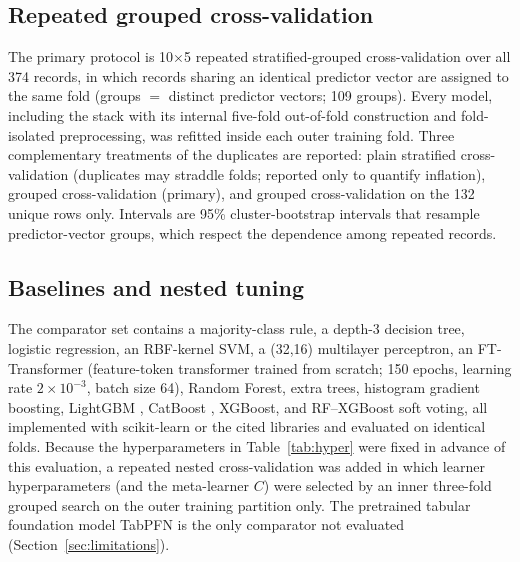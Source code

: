 \documentclass[a4paper,fleqn]{cas-dc}
\begin{document}
\subsection{Repeated grouped cross-validation}
\label{sec:cvprot}
The primary protocol is 10$\times$5 repeated stratified-grouped cross-validation over all 374 records, in which records sharing an identical predictor vector are assigned to the same fold (groups $=$ distinct predictor vectors; 109 groups). Every model, including the stack with its internal five-fold out-of-fold construction and fold-isolated preprocessing, was refitted inside each outer training fold. Three complementary treatments of the duplicates are reported: plain stratified cross-validation (duplicates may straddle folds; reported only to quantify inflation), grouped cross-validation (primary), and grouped cross-validation on the 132 unique rows only. Intervals are 95\% cluster-bootstrap intervals that resample predictor-vector groups, which respect the dependence among repeated records.

\subsection{Baselines and nested tuning}
The comparator set contains a majority-class rule, a depth-3 decision tree, logistic regression, an RBF-kernel SVM, a (32,16) multilayer perceptron, an FT-Transformer \cite{grinsztajn2022} (feature-token transformer trained from scratch; 150 epochs, learning rate $2\times10^{-3}$, batch size 64), Random Forest, extra trees, histogram gradient boosting, LightGBM \cite{ke2017}, CatBoost \cite{prokhorenkova2018}, XGBoost, and RF--XGBoost soft voting, all implemented with scikit-learn \cite{pedregosa2011} or the cited libraries and evaluated on identical folds. Because the hyperparameters in Table~\ref{tab:hyper} were fixed in advance of this evaluation, a repeated nested cross-validation was added in which learner hyperparameters (and the meta-learner $C$) were selected by an inner three-fold grouped search on the outer training partition only. The pretrained tabular foundation model TabPFN \cite{hollmann2025} is the only comparator not evaluated (Section~\ref{sec:limitations}).
\end{document}
